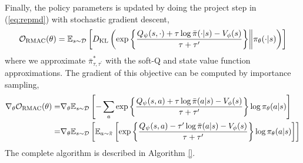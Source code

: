 Finally, the policy parameters is updated by doing the project step in (\ref{eq:repmd}) with stochastic gradient descent,
\begin{align*}
{\mathcal{O}}_{\text{RMAC}} (\theta) = \mathbb{E}_{s \sim {\mathcal{D}}} \left[ D_{\mathrm{KL}} \left( \exp\left\{ \frac{Q_{\psi}(s,\cdot) + \tau \log \bar{\pi}(\cdot|s) - V_{\phi}(s)}{\tau+\tau'} \right\} \middle\Vert \pi_{\theta}(\cdot |s) \right) \right]
\end{align*}
where we approximate $\bar{\pi}_{\tau,\tau^{\prime}}^*$ with the soft-Q and state value function approximations. The gradient of this objective can be computed by importance sampling, 
\begin{align*}
\nabla_\theta {\mathcal{O}}_{\text{RMAC}} (\theta) =& \nabla_\theta \mathbb{E}_{s \sim {\mathcal{D}}} \left[ -\sum_a \exp\left\{ \frac{Q_{\psi}(s,a) + \tau \log \bar{\pi}(a|s) - V_{\phi}(s)}{\tau+\tau'} \right\} \log \pi_{\theta}(a |s) \right] \\ 
= & \nabla_\theta \mathbb{E}_{s \sim {\mathcal{D}}} \left[ \mathbb{E}_{a\sim \bar{\pi}}\left[  \exp\left\{ \frac{Q_{\psi}(s,a) - \tau' \log \bar{\pi}(a|s) - V_{\phi}(s)}{\tau+\tau'} \right\} \log \pi_{\theta}(a |s) \right]   \right] 
\end{align*}
The complete algorithm is described in Algorithm \ref{}.















